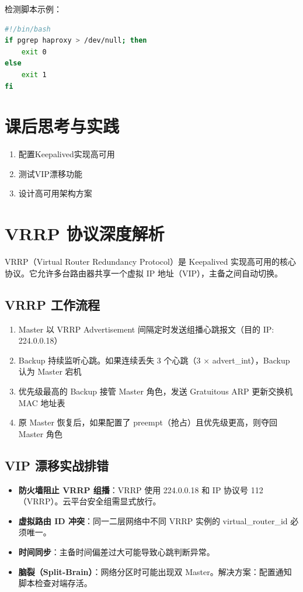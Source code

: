 \documentclass[12pt,UTF8]{ctexbook}
\begin{document}
检测脚本示例：
\begin{lstlisting}[language=bash]
#!/bin/bash
if pgrep haproxy > /dev/null; then
    exit 0
else
    exit 1
fi
\end{lstlisting}

\section{课后思考与实践}
\label{sec:ha-practice}
\begin{enumerate}
    \item 配置Keepalived实现高可用
    \item 测试VIP漂移功能
    \item 设计高可用架构方案
\end{enumerate}

\section{VRRP 协议深度解析}
\label{sec:vrrp-deep}

VRRP（Virtual Router Redundancy Protocol）是 Keepalived 实现高可用的核心协议。它允许多台路由器共享一个虚拟 IP 地址（VIP），主备之间自动切换。

\subsection*{VRRP 工作流程}

\begin{enumerate}
    \item Master 以 VRRP Advertisement 间隔定时发送组播心跳报文（目的 IP: 224.0.0.18）
    \item Backup 持续监听心跳。如果连续丢失 3 个心跳（3 × advert\_int），Backup 认为 Master 宕机
    \item 优先级最高的 Backup 接管 Master 角色，发送 Gratuitous ARP 更新交换机 MAC 地址表
    \item 原 Master 恢复后，如果配置了 preempt（抢占）且优先级更高，则夺回 Master 角色
\end{enumerate}

\subsection*{VIP 漂移实战排错}

\begin{itemize}
    \item \textbf{防火墙阻止 VRRP 组播}：VRRP 使用 224.0.0.18 和 IP 协议号 112（VRRP）。云平台安全组需显式放行。
    \item \textbf{虚拟路由 ID 冲突}：同一二层网络中不同 VRRP 实例的 virtual\_router\_id 必须唯一。
    \item \textbf{时间同步}：主备时间偏差过大可能导致心跳判断异常。
    \item \textbf{脑裂（Split-Brain）}：网络分区时可能出现双 Master。解决方案：配置通知脚本检查对端存活。
\end{itemize}
\end{document}
